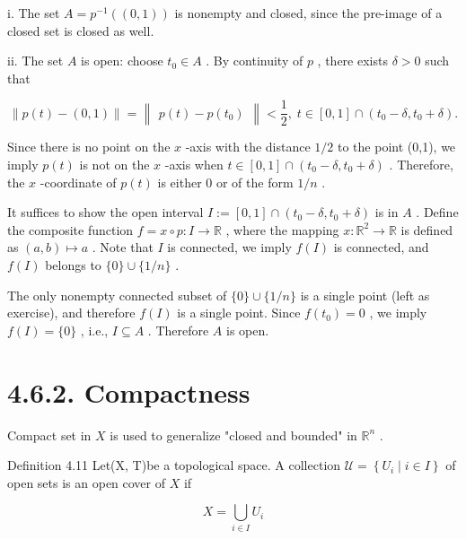 i. The set \(A = {p}^{-1}\left( \left( {0,1}\right) \right)\) is nonempty and closed, since the pre-image of a closed set is closed as well.

ii. The set \(A\) is open: choose \({t}_{0} \in  A\) . By continuity of \(p\) , there exists \(\delta  > 0\) such that

\[
\parallel p\left( t\right)  - \left( {0,1}\right) \parallel  = \begin{Vmatrix}{p\left( t\right)  - p\left( {t}_{0}\right) }\end{Vmatrix} < \frac{1}{2},\;t \in  \left\lbrack  {0,1}\right\rbrack   \cap  \left( {{t}_{0} - \delta ,{t}_{0} + \delta }\right) .
\]

Since there is no point on the \(x\) -axis with the distance \(1/2\) to the point (0,1), we imply \(p\left( t\right)\) is not on the \(x\) -axis when \(t \in  \left\lbrack  {0,1}\right\rbrack   \cap  \left( {{t}_{0} - \delta ,{t}_{0} + \delta }\right)\) . Therefore, the \(x\) -coordinate of \(p\left( t\right)\) is either 0 or of the form \(1/n\) .

It suffices to show the open interval \(I \mathrel{\text{ := }} \left\lbrack  {0,1}\right\rbrack   \cap  \left( {{t}_{0} - \delta ,{t}_{0} + \delta }\right)\) is in \(A\) . Define the composite function \(f = x \circ  p : I \rightarrow  \mathbb{R}\) , where the mapping \(x : {\mathbb{R}}^{2} \rightarrow  \mathbb{R}\) is defined as \(\left( {a,b}\right)  \mapsto  a\) . Note that \(I\) is connected, we imply \(f\left( I\right)\) is connected, and \(f\left( I\right)\) belongs to \(\{ 0\}  \cup  \{ 1/n\}\) .

The only nonempty connected subset of \(\{ 0\}  \cup  \{ 1/n\}\) is a single point (left as exercise), and therefore \(f\left( I\right)\) is a single point. Since \(f\left( {t}_{0}\right)  = 0\) , we imply \(f\left( I\right)  = \{ 0\}\) , i.e., \(I \subseteq  A\) . Therefore \(A\) is open.

\section*{4.6.2. Compactness}

Compact set in \(X\) is used to generalize "closed and bounded" in \({\mathbb{R}}^{n}\) .

Definition 4.11 Let(X, T)be a topological space. A collection \(\mathcal{U} = \left\{  {{U}_{i} \mid  i \in  I}\right\}\) of open sets is an open cover of \(X\) if

\[
X = \mathop{\bigcup }\limits_{{i \in  I}}{U}_{i}
\]

